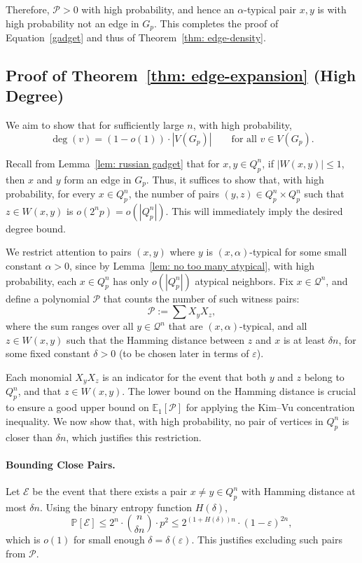 \documentclass[11pt]{article}
\theoremstyle{definition}
\theoremstyle{plain}
\begin{document}
Therefore, \( \mathcal{P} > 0 \) with high probability, and hence an \(\alpha\)-typical pair \( x, y \) is with high probability not an edge in \( G_p \). This completes the proof of Equation~\eqref{gadget} and thus of Theorem~\ref{thm: edge-density}.

\subsection{Proof of Theorem~\ref{thm: edge-expansion} (High Degree)}

We aim to show that for sufficiently large \( n \), with high probability,
\[
\deg(v) = (1 - o(1)) \cdot |V(G_p)| \qquad \text{for all } v \in V(G_p).
\]

Recall from Lemma~\ref{lem: russian gadget} that for \( x, y \in Q_p^n \), if \( |W(x, y)| \leq 1 \), then \( x \) and \( y \) form an edge in \( G_p \). Thus, it suffices to show that, with high probability, for every \( x \in Q_p^n \), the number of pairs \( (y, z) \in Q_p^n \times Q_p^n \) such that \( z \in W(x, y) \) is \( o(2^n p) = o(|Q_p^n|) \). This will immediately imply the desired degree bound.

We restrict attention to pairs \( (x, y) \) where \( y \) is \((x, \alpha)\)-typical for some small constant \( \alpha > 0 \), since by Lemma~\ref{lem: no too many atypical}, with high probability, each \( x \in Q_p^n \) has only \( o(|Q_p^n|) \) atypical neighbors. 
Fix \( x \in \mathcal{Q}^n \), and define a polynomial \( \mathcal{P} \) that counts the number of such witness pairs:
\[
\mathcal{P} := \sum X_y X_z,
\]
where the sum ranges over all \( y \in \mathcal{Q}^n \) that are \((x, \alpha)\)-typical, and all \( z \in W(x, y) \) such that the Hamming distance between \( z \) and \( x \) is at least \( \delta n \), for some fixed constant \( \delta > 0 \) (to be chosen later in terms of \( \varepsilon \)).

Each monomial \( X_y X_z \) is an indicator for the event that both \( y \) and \( z \) belong to \( Q_p^n \), and that \( z \in W(x, y) \). The lower bound on the Hamming distance is crucial to ensure a good upper bound on \( \mathbb{E}_1[\mathcal{P}] \) for applying the Kim–Vu concentration inequality. We now show that, with high probability, no pair of vertices in \( Q_p^n \) is closer than \( \delta n \), which justifies this restriction.


\paragraph{\textbf{Bounding Close Pairs.}}
Let \( \mathcal{E} \) be the event that there exists a pair \( x \neq y \in Q_p^n \) with Hamming distance at most \( \delta n \). Using the binary entropy function \( H(\delta) \),
\[
\mathbb{P}[\mathcal{E}] \leq 2^n \cdot \binom{n}{\delta n} \cdot p^2 \leq 2^{(1 + H(\delta)) n} \cdot (1 - \varepsilon)^{2n},
\]
which is \( o(1) \) for small enough \( \delta = \delta(\varepsilon) \). This justifies excluding such pairs from \( \mathcal{P} \).
\end{document}

